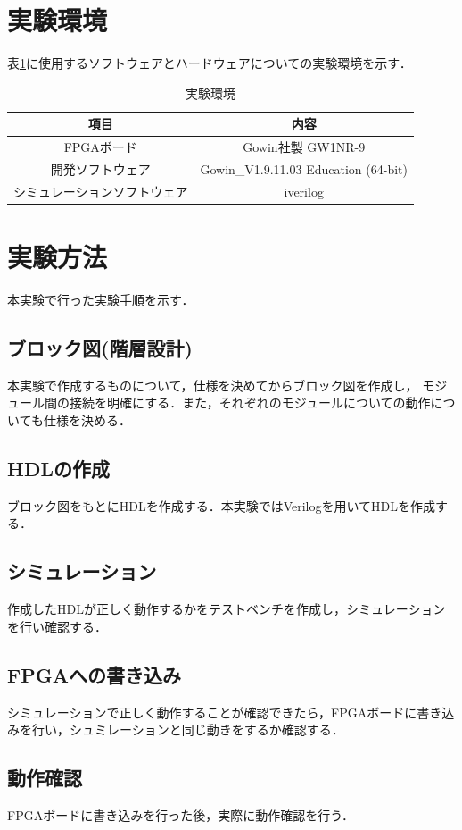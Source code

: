\documentclass[a4paper,11pt]{ltjsarticle}
\begin{document}
\section{実験環境}
表\ref{tab:zikken}に使用するソフトウェアとハードウェアについての実験環境を示す．
\begin{table}[H]
    \centering
    \caption{実験環境}
    \label{tab:zikken}
    \begin{tabular}{|c|c|}
        \hline
        項目             & 内容                                   \\
        \hline
        FPGAボード        & Gowin社製 GW1NR-9                      \\
        \hline
        開発ソフトウェア       & Gowin\_V1.9.11.03 Education (64-bit) \\
        \hline
        シミュレーションソフトウェア & iverilog                             \\
        \hline
    \end{tabular}
\end{table}
\section{実験方法}
本実験で行った実験手順を示す．
\subsection{ブロック図(階層設計)}
本実験で作成するものについて，仕様を決めてからブロック図を作成し，
モジュール間の接続を明確にする．また，それぞれのモジュールについての動作についても仕様を決める．
\subsection{HDLの作成}
ブロック図をもとにHDLを作成する．本実験ではVerilogを用いてHDLを作成する．
\subsection{シミュレーション}
作成したHDLが正しく動作するかをテストベンチを作成し，シミュレーションを行い確認する．
\subsection{FPGAへの書き込み}
シミュレーションで正しく動作することが確認できたら，FPGAボードに書き込みを行い，シュミレーションと同じ動きをするか確認する．
\subsection{動作確認}
FPGAボードに書き込みを行った後，実際に動作確認を行う．
\end{document}
